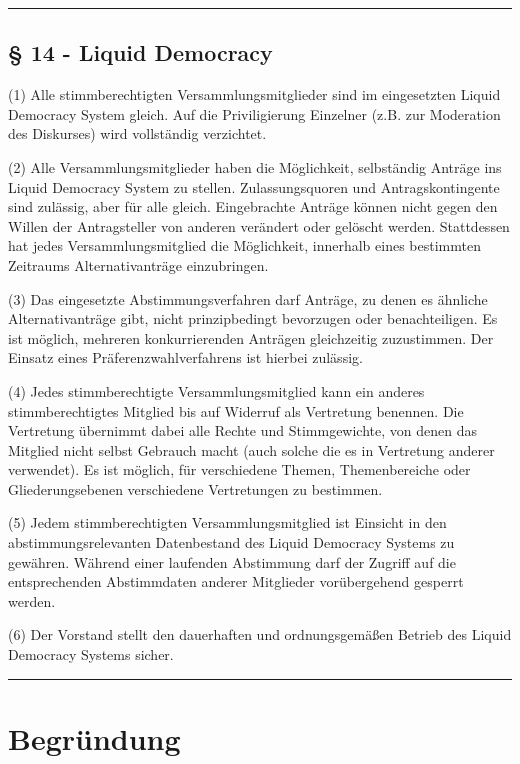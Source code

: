 \begin{center}\rule{3in}{0.4pt}\end{center}

\subsection{§ 14 - Liquid Democracy}

(1) Alle stimmberechtigten Versammlungsmitglieder sind im eingesetzten Liquid Democracy System gleich. Auf die Priviligierung Einzelner (z.B. zur Moderation des Diskurses) wird vollständig verzichtet.

(2) Alle Versammlungsmitglieder haben die Möglichkeit, selbständig Anträge ins Liquid Democracy System zu stellen. Zulassungsquoren und Antragskontingente sind zulässig, aber für alle gleich. Eingebrachte Anträge können nicht gegen den Willen der Antragsteller von anderen verändert oder gelöscht werden. Stattdessen hat jedes Versammlungsmitglied die Möglichkeit, innerhalb eines bestimmten Zeitraums Alternativanträge einzubringen.

(3) Das eingesetzte Abstimmungsverfahren darf Anträge, zu denen es ähnliche Alternativanträge gibt, nicht prinzipbedingt bevorzugen oder benachteiligen. Es ist möglich, mehreren konkurrierenden Anträgen gleichzeitig zuzustimmen. Der Einsatz eines Präferenzwahlverfahrens ist hierbei zulässig.

(4) Jedes stimmberechtigte Versammlungsmitglied kann ein anderes stimmberechtigtes Mitglied bis auf Widerruf als Vertretung benennen. Die Vertretung übernimmt dabei alle Rechte und Stimmgewichte, von denen das Mitglied nicht selbst Gebrauch macht (auch solche die es in Vertretung anderer verwendet). Es ist möglich, für verschiedene Themen, Themenbereiche oder Gliederungsebenen verschiedene Vertretungen zu bestimmen.

(5) Jedem stimmberechtigten Versammlungsmitglied ist Einsicht in den abstimmungsrelevanten Datenbestand des Liquid Democracy Systems zu gewähren. Während einer laufenden Abstimmung darf der Zugriff auf die entsprechenden Abstimmdaten anderer Mitglieder vorübergehend gesperrt werden.

(6) Der Vorstand stellt den dauerhaften und ordnungsgemäßen Betrieb des Liquid Democracy Systems sicher.

\begin{center}\rule{3in}{0.4pt}\end{center}

\section{Begründung}

